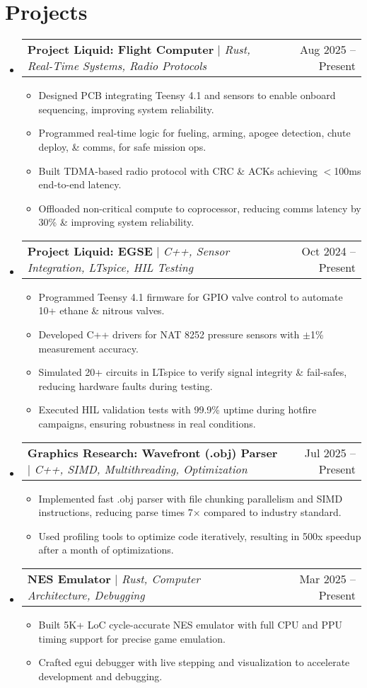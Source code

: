 \documentclass[letterpaper,11pt]{article}
\makeatletter
\newcommand{\resumeItem}[1]{
  \item\small{
    {#1 \vspace{-2pt}}
  }
}
\newcommand{\resumeProjectHeading}[2]{
    \item
    \begin{tabular*}{0.97\textwidth}{l@{\extracolsep{\fill}}r}
      \small#1 & #2 \\
    \end{tabular*}\vspace{-7pt}
}
\newcommand{\resumeSubHeadingListStart}{\begin{itemize}[leftmargin=0.15in, label={}]}
\newcommand{\resumeSubHeadingListEnd}{\end{itemize}}
\newcommand{\resumeItemListStart}{\begin{itemize}}
\newcommand{\resumeItemListEnd}{\end{itemize}\vspace{-5pt}}
\makeatother
\begin{document}
\section{Projects}
    \resumeSubHeadingListStart
        \resumeProjectHeading
          {\textbf{Project Liquid: Flight Computer} $|$ \emph{Rust, Real-Time Systems, Radio Protocols}}{Aug 2025 -- Present}
          \resumeItemListStart
            \resumeItem{Designed PCB integrating Teensy 4.1 and sensors to enable onboard sequencing, improving system reliability.}
            \resumeItem{Programmed real-time logic for fueling, arming, apogee detection, chute deploy, \& comms, for safe mission ops.}
            \resumeItem{Built TDMA-based radio protocol with CRC \& ACKs achieving $<$100ms end-to-end latency.}
            \resumeItem{Offloaded non-critical compute to coprocessor, reducing comms latency by 30\% \& improving system reliability.}
          \resumeItemListEnd
        \resumeProjectHeading
          {\textbf{Project Liquid: EGSE} $|$ \emph{C++, Sensor Integration, LTspice, HIL Testing}}{Oct 2024 -- Present}
          \resumeItemListStart
            \resumeItem{Programmed Teensy 4.1 firmware for GPIO valve control to automate 10+ ethane \& nitrous valves.}
            \resumeItem{Developed C++ drivers for NAT 8252 pressure sensors with $\pm$1\% measurement accuracy.}
            \resumeItem{Simulated 20+ circuits in LTspice to verify signal integrity \& fail-safes, reducing hardware faults during testing.}
            \resumeItem{Executed HIL validation tests with 99.9\% uptime during hotfire campaigns, ensuring robustness in real conditions.}
          \resumeItemListEnd
        \resumeProjectHeading
          {\textbf{Graphics Research: Wavefront (.obj) Parser} $|$ \emph{C++, SIMD, Multithreading, Optimization}}{Jul 2025 -- Present}
          \resumeItemListStart
            \resumeItem{Implemented fast .obj parser with file chunking parallelism and SIMD instructions, reducing parse times 7× compared to industry standard.}
            \resumeItem{Used profiling tools to optimize code iteratively, resulting in 500x speedup after a month of optimizations.}
          \resumeItemListEnd
        \resumeProjectHeading
          {\textbf{NES Emulator} $|$ \emph{Rust, Computer Architecture, Debugging}}{Mar 2025 -- Present}
          \resumeItemListStart
            \resumeItem{Built 5K+ LoC cycle-accurate NES emulator with full CPU and PPU timing support for precise game emulation.}
            \resumeItem{Crafted egui debugger with live stepping and visualization to accelerate development and debugging.}
          \resumeItemListEnd
    \resumeSubHeadingListEnd
\end{document}
